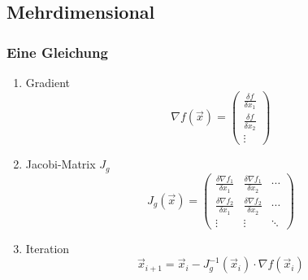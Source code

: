 \subsection{Mehrdimensional}
\subsubsection*{Eine Gleichung}
\begin{enumerate}

	\item Gradient
	\begin{displaymath}
		\nabla f(\vec{x}) =
		\begin{pmatrix}
			\frac{\delta f}{\delta x_1} \\
			\frac{\delta f}{\delta x_2} \\
			\vdots
		\end{pmatrix}
	\end{displaymath}
	
	\item Jacobi-Matrix $J_g$
	\begin{displaymath}
		J_g(\vec{x}) =
		\begin{pmatrix}
			\frac{\delta \nabla f_1}{\delta x_1}  & \frac{\delta \nabla f_1}{\delta x_2} & \cdots \\[5pt]
			\frac{\delta \nabla f_2}{\delta x_1}  & \frac{\delta \nabla f_2}{\delta x_2} & \cdots \\
			\vdots & \vdots & \ddots
		\end{pmatrix}
	\end{displaymath}
	
	\item Iteration
	\begin{displaymath}
		\vec{x}_{i+1} = \vec{x}_i - J_g^{-1}(\vec{x}_i) \cdot \nabla f(\vec{x}_i)
	\end{displaymath}

\end{enumerate}

